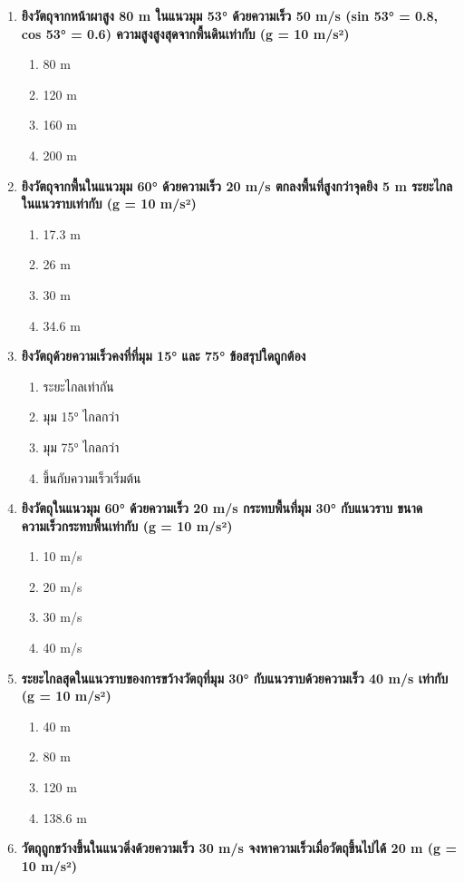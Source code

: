 \documentclass[12pt]{article}
\begin{document}
\begin{enumerate}
\item \textbf{ยิงวัตถุจากหน้าผาสูง 80 m ในแนวมุม 53° ด้วยความเร็ว 50 m/s (sin 53° = 0.8, cos 53° = 0.6) ความสูงสูงสุดจากพื้นดินเท่ากับ (g = 10 m/s²)}
\begin{enumerate}[label=\alph*)]
\item 80 m
\item 120 m
\item 160 m
\item 200 m
\end{enumerate}
\item \textbf{ยิงวัตถุจากพื้นในแนวมุม 60° ด้วยความเร็ว 20 m/s ตกลงพื้นที่สูงกว่าจุดยิง 5 m ระยะไกลในแนวราบเท่ากับ (g = 10 m/s²)}
\begin{enumerate}[label=\alph*)]
\item 17.3 m
\item 26 m
\item 30 m
\item 34.6 m
\end{enumerate}
\item \textbf{ยิงวัตถุด้วยความเร็วคงที่ที่มุม 15° และ 75° ข้อสรุปใดถูกต้อง}
\begin{enumerate}[label=\alph*)]
\item ระยะไกลเท่ากัน
\item มุม 15° ไกลกว่า
\item มุม 75° ไกลกว่า
\item ขึ้นกับความเร็วเริ่มต้น
\end{enumerate}
\item \textbf{ยิงวัตถุในแนวมุม 60° ด้วยความเร็ว 20 m/s กระทบพื้นที่มุม 30° กับแนวราบ ขนาดความเร็วกระทบพื้นเท่ากับ (g = 10 m/s²)}
\begin{enumerate}[label=\alph*)]
\item 10 m/s
\item 20 m/s
\item 30 m/s
\item 40 m/s
\end{enumerate}
\item \textbf{ระยะไกลสุดในแนวราบของการขว้างวัตถุที่มุม 30° กับแนวราบด้วยความเร็ว 40 m/s เท่ากับ (g = 10 m/s²)}
\begin{enumerate}[label=\alph*)]
\item 40 m
\item 80 m
\item 120 m
\item 138.6 m
\end{enumerate}
\item \textbf{วัตถุถูกขว้างขึ้นในแนวดิ่งด้วยความเร็ว 30 m/s จงหาความเร็วเมื่อวัตถุขึ้นไปได้ 20 m (g = 10 m/s²)}

\end{enumerate}
\end{document}
